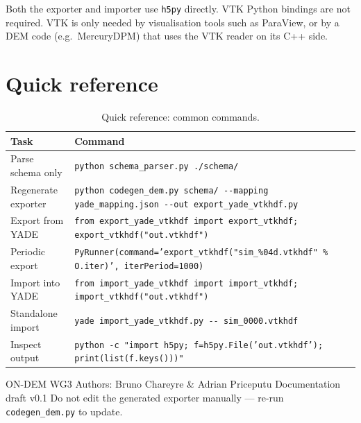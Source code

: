 \documentclass[11pt,a4paper]{article}
\begin{document}
\begin{notebox}
Both the exporter and importer use \texttt{h5py} directly. VTK Python
bindings are not required. VTK is only needed by visualisation tools such as
ParaView, or by a DEM code (e.g.\ MercuryDPM) that uses the VTK reader on
its C++ side.
\end{notebox}

\section{Quick reference}
\label{sec:quickref}

\begin{table}[htbp]
\centering
\begin{tabularx}{\textwidth}{lX}
\toprule
\sffamily\textbf{Task} & \sffamily\textbf{Command} \\
\midrule
Parse schema only    &
  \texttt{python schema\_parser.py ./schema/} \\[4pt]
Regenerate exporter  &
  \texttt{python codegen\_dem.py schema/ -{}-mapping yade\_mapping.json -{}-out export\_yade\_vtkhdf.py} \\[4pt]
Export from YADE     &
  \texttt{from export\_yade\_vtkhdf import export\_vtkhdf; export\_vtkhdf("out.vtkhdf")} \\[4pt]
Periodic export      &
  \texttt{PyRunner(command='export\_vtkhdf("sim\_\%04d.vtkhdf" \% O.iter)', iterPeriod=1000)} \\[4pt]
Import into YADE     &
  \texttt{from import\_yade\_vtkhdf import import\_vtkhdf; import\_vtkhdf("out.vtkhdf")} \\[4pt]
Standalone import    &
  \texttt{yade import\_yade\_vtkhdf.py -{}- sim\_0000.vtkhdf} \\[4pt]
Inspect output       &
  \texttt{python -c "import h5py; f=h5py.File('out.vtkhdf'); print(list(f.keys()))"} \\
\bottomrule
\end{tabularx}
\caption{Quick reference: common commands.}
\end{table}

\vfill
\begin{tcolorbox}[colback=GrayLight, colframe=RuleLine, arc=4pt, boxrule=0.4pt]
\centering\small\sffamily\color{GrayMid}
ON-DEM WG3 \textbullet\;
Authors: Bruno Chareyre \& Adrian Priceputu \textbullet\;
Documentation draft v0.1 \textbullet\;
Do not edit the generated exporter manually --- re-run \texttt{codegen\_dem.py} to update.
\end{tcolorbox}
\end{document}
